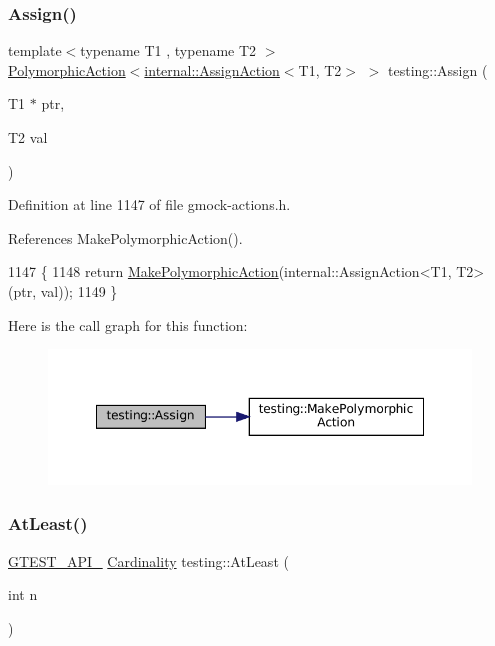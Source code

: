 \subsubsection{\texorpdfstring{Assign()}{Assign()}}
{\footnotesize\ttfamily template$<$typename T1 , typename T2 $>$ \\
\hyperlink{classtesting_1_1PolymorphicAction}{Polymorphic\+Action}$<$\hyperlink{classtesting_1_1internal_1_1AssignAction}{internal\+::\+Assign\+Action}$<$T1, T2$>$ $>$ testing\+::\+Assign (\begin{DoxyParamCaption}\item[{T1 $\ast$}]{ptr,  }\item[{T2}]{val }\end{DoxyParamCaption})}



Definition at line 1147 of file gmock-\/actions.\+h.



References Make\+Polymorphic\+Action().


\begin{DoxyCode}
1147                                                                          \{
1148   \textcolor{keywordflow}{return} \hyperlink{namespacetesting_a36bd06c5ea972c6df0bd9f40a7a94c65}{MakePolymorphicAction}(internal::AssignAction<T1, T2>(ptr, val));
1149 \}
\end{DoxyCode}
Here is the call graph for this function\+:
\nopagebreak
\begin{figure}[H]
\begin{center}
\leavevmode
\includegraphics[width=348pt]{namespacetesting_abfc4121b8708e8b22a096ff8be88a9d0_cgraph}
\end{center}
\end{figure}
\mbox{\label{namespacetesting_a137297cb3c582843989fbd937cf0fed2}} 
\subsubsection{\texorpdfstring{At\+Least()}{AtLeast()}}
{\footnotesize\ttfamily \hyperlink{gtest-port_8h_aa73be6f0ba4a7456180a94904ce17790}{G\+T\+E\+S\+T\+\_\+\+A\+P\+I\+\_\+} \hyperlink{classtesting_1_1Cardinality}{Cardinality} testing\+::\+At\+Least (\begin{DoxyParamCaption}\item[{int}]{n }\end{DoxyParamCaption})}



